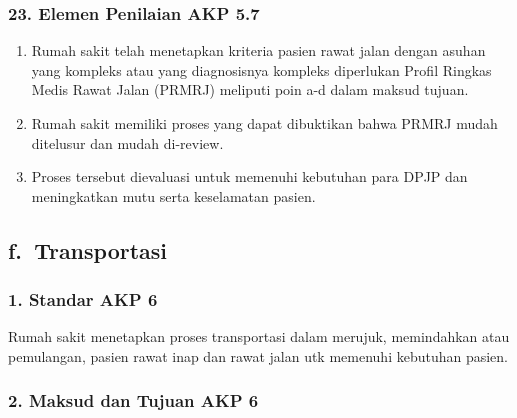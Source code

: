 \documentclass[
]{book}
\providecommand{\tightlist}{%
  \setlength{\itemsep}{0pt}\setlength{\parskip}{0pt}}
\begin{document}
\hypertarget{elemen-penilaian-akp-5.7}{%
\subsubsection*{23. Elemen Penilaian AKP 5.7}\label{elemen-penilaian-akp-5.7}}

\begin{enumerate}
\def\labelenumi{\alph{enumi}.}
\tightlist
\item
  Rumah sakit telah menetapkan kriteria pasien rawat jalan dengan asuhan yang kompleks atau yang diagnosisnya kompleks diperlukan Profil Ringkas Medis Rawat Jalan (PRMRJ) meliputi poin a-d dalam maksud tujuan.
\item
  Rumah sakit memiliki proses yang dapat dibuktikan bahwa PRMRJ mudah ditelusur dan mudah di-review.
\item
  Proses tersebut dievaluasi untuk memenuhi kebutuhan para DPJP dan meningkatkan mutu serta keselamatan pasien.
\end{enumerate}

\hypertarget{f.-transportasi}{%
\subsection*{f.~Transportasi}\label{f.-transportasi}}

\hypertarget{standar-akp-6}{%
\subsubsection*{1. Standar AKP 6}\label{standar-akp-6}}

Rumah sakit menetapkan proses transportasi dalam merujuk, memindahkan atau pemulangan, pasien rawat inap dan rawat jalan utk memenuhi kebutuhan pasien.

\hypertarget{maksud-dan-tujuan-akp-6}{%
\subsubsection*{2. Maksud dan Tujuan AKP 6}\label{maksud-dan-tujuan-akp-6}}
\end{document}
